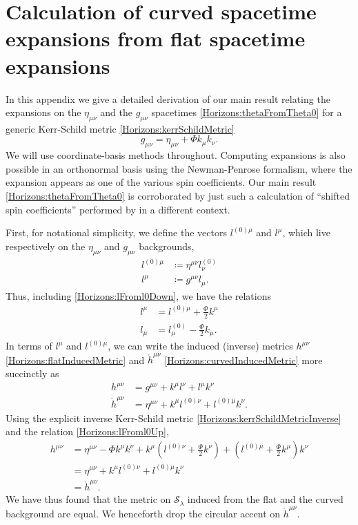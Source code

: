 \chapter{Calculation of curved spacetime expansions from flat spacetime expansions} \label{Horizons:app:ExpansionCalculation} 
In this appendix we give a detailed derivation of our main result relating the expansions on the $\eta_{\mu \nu}$ and the $g_{\mu \nu}$ spacetimes \eqref{Horizons:thetaFromTheta0} for a generic Kerr-Schild metric
\eqref{Horizons:kerrSchildMetric}
\begin{equation}
    g_{\mu \nu} = \eta_{\mu \nu} + \Phi k_{\mu} k_{\nu}.
\end{equation}
We will use coordinate-basis methods throughout. Computing expansions is also possible in an orthonormal basis using the Newman-Penrose formalism, where the expansion appears as one of the various spin coefficients. Our main result \eqref{Horizons:thetaFromTheta0} is corroborated by just such a calculation of ``shifted spin coefficients'' performed by \cite{BenTov:2017kyf} in a different context.

First, for notational simplicity, we define the vectors $l^{(0)\mu}$ and $l^{\mu}$, which live respectively on the $\eta_{\mu \nu}$ and $g_{\mu \nu}$ backgrounds,
\begin{align}
    l^{(0) \mu} &\coloneqq \eta^{\mu \nu} l^{(0)}_{\nu} \\
    l^{\mu} &\coloneqq g^{\mu \nu} l_{\mu}.
\end{align}
Thus, including \eqref{Horizons:lFroml0Down}, we have the relations
\begin{align}
    l^{\mu} &= l^{(0) \mu} + \frac{\Phi}{2} k^{\mu} \label{Horizons:lFroml0Up} \\
    l_{\mu} &= l^{(0)}_{\mu} - \frac{\Phi}{2} k_{\mu}.
\end{align}
In terms of $l^{\mu}$ and $l^{(0) \mu}$, we can write the induced (inverse) metrics $h^{\mu \nu}$ \eqref{Horizons:flatInducedMetric} and $\mathring{h}^{\mu \nu}$ \eqref{Horizons:curvedInducedMetric} more succinctly as
\begin{align}
    h^{\mu \nu} &= g^{\mu \nu} + k^\mu l^\nu + l^\mu k^\nu \\
    \mathring{h}^{\mu \nu} &= \eta^{\mu \nu} + k^\mu l^{(0) \nu} + l^{(0) \mu} k^\nu.
\end{align}
Using the explicit inverse Kerr-Schild metric \eqref{Horizons:kerrSchildMetricInverse} and the relation \eqref{Horizons:lFroml0Up}, 
\begin{equation}
    \begin{split}
        h^{\mu \nu}
        &= \eta^{\mu \nu} - \Phi k^\mu k^\nu + k^\mu \left( l^{(0) \nu} + \frac{\Phi}{2} k^\nu \right) + \left( l^{(0) \mu} + \frac{\Phi}{2} k^\mu \right) k^\nu \\
        &= \eta^{\mu \nu} + k^\mu l^{(0) \nu} + l^{(0) \mu} k^\nu \\
        &= \mathring{h}^{\mu \nu}.
    \end{split}
\end{equation}
We have thus found that the metric on $\mathcal{S}_\lambda$ induced from the flat and the curved background are equal. We henceforth drop the circular accent on $\mathring{h}^{\mu \nu}$.

